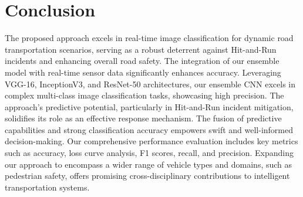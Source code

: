 \documentclass[10pt, conference, a4paper, compsocconf]{IEEEtran}
\begin{document}
\section{Conclusion}
The proposed approach excels in real-time image classification for dynamic road transportation scenarios, serving as a robust deterrent against Hit-and-Run incidents and enhancing overall road safety. The integration of our ensemble model with real-time sensor data significantly enhances accuracy. Leveraging VGG-16, InceptionV3, and ResNet-50 architectures, our ensemble CNN excels in complex multi-class image classification tasks, showcasing high precision. The approach's predictive potential, particularly in Hit-and-Run incident mitigation, solidifies its role as an effective response mechanism. The fusion of predictive capabilities and strong classification accuracy empowers swift and well-informed decision-making. Our comprehensive performance evaluation includes key metrics such as accuracy, loss curve analysis, F1 scores, recall, and precision. Expanding our approach to encompass a wider range of vehicle types and domains, such as pedestrian safety, offers promising cross-disciplinary contributions to intelligent transportation systems.



\end{document}

